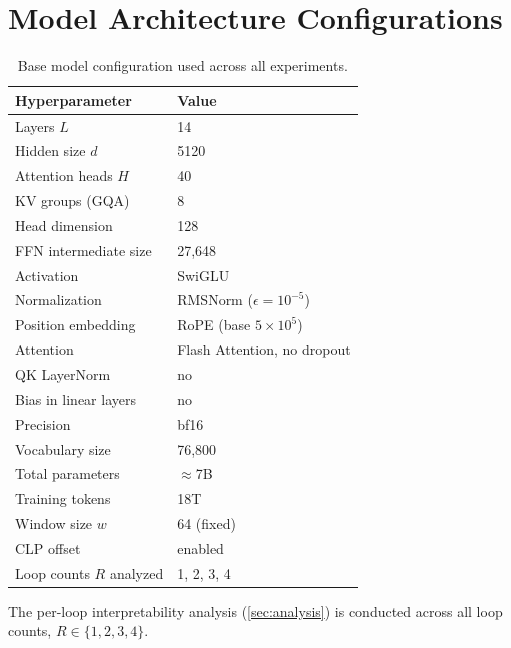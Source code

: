 \documentclass[11pt, a4paper, logo, copyright, nonumbering]{map}
\newcommand{\loopcount}{R}
\begin{document}
\section{Model Architecture Configurations}
\label{app:model-config}

\begin{table}[H]
\centering
\caption{Base model configuration used across all experiments.}
\label{tab:model-config}
\begin{tabular}{ll}
\toprule
\textbf{Hyperparameter} & \textbf{Value} \\
\midrule
Layers $L$                        & 14 \\
Hidden size $d$                   & 5120 \\
Attention heads $H$               & 40 \\
KV groups (GQA)                   & 8 \\
Head dimension                    & 128 \\
FFN intermediate size             & 27{,}648 \\
Activation                        & SwiGLU \\
Normalization                     & RMSNorm ($\epsilon = 10^{-5}$) \\
Position embedding                & RoPE (base $5\times10^{5}$) \\
Attention                         & Flash Attention, no dropout \\
QK LayerNorm                      & no \\
Bias in linear layers             & no \\
Precision                         & bf16 \\
Vocabulary size                   & 76{,}800 \\
Total parameters                  & $\approx$7B \\
Training tokens                   & 18T \\
Window size $w$                   & 64 (fixed) \\
CLP offset                        & enabled \\
Loop counts $\loopcount$ analyzed & 1, 2, 3, 4 \\
\bottomrule
\end{tabular}
\end{table}

\noindent
The per-loop interpretability analysis (\autoref{sec:analysis}) is
conducted across all loop counts, $\loopcount \in \{1, 2, 3, 4\}$.
\end{document}
